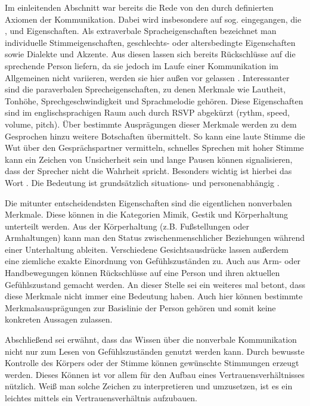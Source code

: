 Im einleitenden Abschnitt  war bereits die Rede von den durch  definierten Axiomen der Kommunikation.
Dabei wird insbesondere auf sog.  eingegangen, die ,  und  Eigenschaften.
Als extraverbale Spracheigenschaften bezeichnet man individuelle Stimmeigenschaften, geschlechts- oder altersbedingte Eigenschaften sowie Dialekte und Akzente.
Aus diesen lassen sich bereits Rückschlüsse auf die sprechende Person liefern, da sie jedoch im Laufe einer Kommunikation im Allgemeinen nicht variieren, werden sie hier außen vor gelassen \citep{grundlagen-der-kommunikation}.
Interessanter sind die paraverbalen Sprecheigenschaften, zu denen Merkmale wie Lautheit, Tonhöhe, Sprechgeschwindigkeit und Sprachmelodie gehören.
Diese Eigenschaften sind im englischsprachigen Raum auch durch RSVP abgekürzt (rythm, speed, volume, pitch).
Über bestimmte Ausprägungen dieser Merkmale werden zu dem Gesprochen hinzu weitere Botschaften übermittelt.
So kann eine laute Stimme die Wut über den Gesprächspartner vermitteln, schnelles Sprechen mit hoher Stimme kann ein Zeichen von Unsicherheit sein und lange Pausen können signalisieren, dass der Sprecher nicht die Wahrheit spricht.
Besonders wichtig ist hierbei das Wort .
Die Bedeutung ist grundsätzlich situations- und personenabhängig \citep{grundlagen-der-kommunikation}.

Die mitunter entscheidendsten Eigenschaften sind die eigentlichen nonverbalen Merkmale.
Diese können in die Kategorien Mimik, Gestik und Körperhaltung unterteilt werden.
Aus der Körperhaltung (z.B. Fußstellungen oder Armhaltungen) kann man den Status zwischenmenschlicher Beziehungen während einer Unterhaltung ableiten.
Verschiedene Gesichtsausdrücke lassen außerdem eine ziemliche exakte Einordnung von Gefühlszuständen zu.
Auch aus Arm- oder Handbewegungen können Rückschlüsse auf eine Person und ihren aktuellen Gefühlszustand gemacht werden.
An dieser Stelle sei ein weiteres mal betont, dass diese Merkmale nicht immer eine Bedeutung haben.
Auch hier können bestimmte Merkmalsausprägungen zur Basislinie der Person gehören und somit keine konkreten Aussagen zulassen.
\citep{hadnagy}
\citep{grundlagen-der-kommunikation}

Abschließend sei erwähnt, dass das Wissen über die nonverbale Kommunikation nicht nur zum Lesen von Gefühlszuständen genutzt werden kann.
Durch bewusste Kontrolle des Körpers oder der Stimme können gewünschte Stimmungen erzeugt werden.
Dieses Können ist vor allem für den Aufbau eines Vertrauensverhältnisses nützlich.
Weiß man solche Zeichen zu interpretieren und umzusetzen, ist es ein leichtes mittels  ein Vertrauensverhältnis aufzubauen.
\citep{human-hacking}
\citep{hadnagy}
\citep{hacking-the-human}

